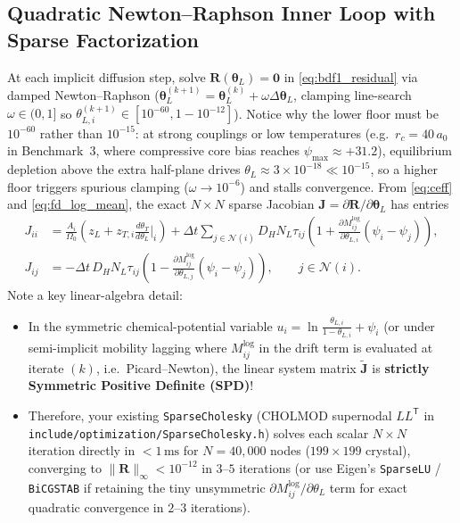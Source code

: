 \documentclass[11pt,a4paper]{article}
\newcommand{\T}{^{\mathsf T}}
\newcommand{\code}[1]{\texttt{#1}}
\begin{document}
\subsection{Quadratic Newton--Raphson Inner Loop with Sparse Factorization}

At each implicit diffusion step, solve $\mathbf{R}(\boldsymbol{\theta}_L) = \mathbf{0}$ in \eqref{eq:bdf1_residual} via damped Newton--Raphson ($\boldsymbol{\theta}_L^{(k+1)} = \boldsymbol{\theta}_L^{(k)} + \omega \Delta\boldsymbol{\theta}_L$, clamping line-search $\omega \in (0,1]$ so $\theta_{L,i}^{(k+1)} \in [10^{-60}, 1 - 10^{-12}]$). Notice why the lower floor must be $10^{-60}$ rather than $10^{-15}$: at strong couplings or low temperatures (e.g.\ $r_c = 40\,a_0$ in Benchmark~3, where compressive core bias reaches $\psi_{\max} \approx +31.2$), equilibrium depletion above the extra half-plane drives $\theta_L \approx 3 \times 10^{-18} \ll 10^{-15}$, so a higher floor triggers spurious clamping ($\omega \to 10^{-6}$) and stalls convergence. From \eqref{eq:ceff} and \eqref{eq:fd_log_mean}, the exact $N \times N$ sparse Jacobian $\mathbf{J} = \partial \mathbf{R} / \partial \boldsymbol{\theta}_L$ has entries
\begin{align}
  J_{ii} &= \frac{A_i}{\Omega_0}\left(z_L + z_{T,i}\frac{d\theta_T}{d\theta_L}\Big|_i\right)
           + \Delta t \sum_{j \in \mathcal{N}(i)} D_H N_L \tau_{ij}
             \left(1 + \frac{\partial M_{ij}^{\text{log}}}{\partial \theta_{L,i}}(\psi_i - \psi_j)\right),
  \label{eq:jac_diag}\\
  J_{ij} &= -\Delta t\, D_H N_L \tau_{ij}
             \left(1 - \frac{\partial M_{ij}^{\text{log}}}{\partial \theta_{L,j}}(\psi_i - \psi_j)\right),
  \qquad j \in \mathcal{N}(i).
  \label{eq:jac_offdiag}
\end{align}
Note a key linear-algebra detail:
\begin{itemize}[nosep]
  \item In the symmetric chemical-potential variable $u_i = \ln\frac{\theta_{L,i}}{1-\theta_{L,i}} + \psi_i$ (or under semi-implicit mobility lagging where $M_{ij}^{\text{log}}$ in the drift term is evaluated at iterate $(k)$, i.e.\ Picard--Newton), the linear system matrix $\tilde{\mathbf{J}}$ is \textbf{strictly Symmetric Positive Definite (SPD)}!
  \item Therefore, your existing \code{SparseCholesky} (CHOLMOD supernodal $LL\T$ in \code{include/\allowbreak{}optimization/\allowbreak{}SparseCholesky.h}) solves each scalar $N \times N$ iteration directly in $< 1\,\mathrm{ms}$ for $N = 40{,}000$ nodes ($199 \times 199$ crystal), converging to $\|\mathbf{R}\|_\infty < 10^{-12}$ in $3\text{--}5$ iterations (or use Eigen's \code{SparseLU} / \code{BiCGSTAB} if retaining the tiny unsymmetric $\partial M_{ij}^{\text{log}}/\partial\theta_L$ term for exact quadratic convergence in $2\text{--}3$ iterations).
\end{itemize}
\end{document}
